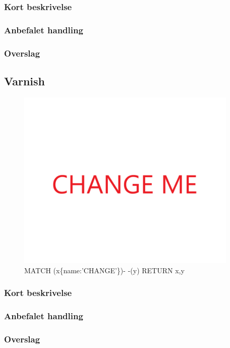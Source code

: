 \documentclass{article}
\begin{document}
\subsubsection{Kort beskrivelse}
\subsubsection{Anbefalet handling}
\subsubsection{Overslag}
\subsection{Varnish}
\begin{figure}[h]
\includegraphics[width=300pt]{CHANGE.PNG}
\caption{MATCH (x\{name:'CHANGE'\})- -(y) RETURN x,y}
\end{figure}
\subsubsection{Kort beskrivelse}
\subsubsection{Anbefalet handling}
\subsubsection{Overslag}
\end{document}
